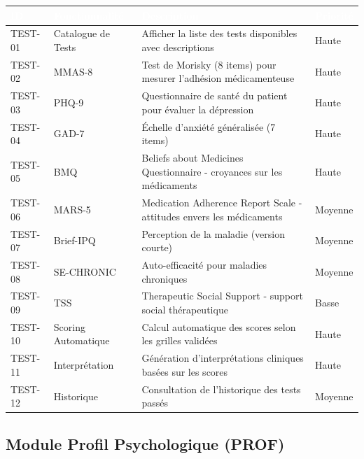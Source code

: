 \documentclass[12pt,a4paper]{report}
\begin{document}
\begin{longtable}{|p{2cm}|p{4cm}|p{7cm}|p{1.5cm}|}
    \hline
    \rowcolor{emsiblue}\textcolor{white}{\textbf{ID}} & \textcolor{white}{\textbf{Fonctionnalité}} & \textcolor{white}{\textbf{Description}} & \textcolor{white}{\textbf{Priorité}} \\
    \hline
    \endfirsthead
    
    TEST-01 & Catalogue de Tests & Afficher la liste des tests disponibles avec descriptions & Haute \\
    \hline
    TEST-02 & MMAS-8 & Test de Morisky (8 items) pour mesurer l'adhésion médicamenteuse & Haute \\
    \hline
    TEST-03 & PHQ-9 & Questionnaire de santé du patient pour évaluer la dépression & Haute \\
    \hline
    TEST-04 & GAD-7 & Échelle d'anxiété généralisée (7 items) & Haute \\
    \hline
    TEST-05 & BMQ & Beliefs about Medicines Questionnaire - croyances sur les médicaments & Haute \\
    \hline
    TEST-06 & MARS-5 & Medication Adherence Report Scale - attitudes envers les médicaments & Moyenne \\
    \hline
    TEST-07 & Brief-IPQ & Perception de la maladie (version courte) & Moyenne \\
    \hline
    TEST-08 & SE-CHRONIC & Auto-efficacité pour maladies chroniques & Moyenne \\
    \hline
    TEST-09 & TSS & Therapeutic Social Support - support social thérapeutique & Basse \\
    \hline
    TEST-10 & Scoring Automatique & Calcul automatique des scores selon les grilles validées & Haute \\
    \hline
    TEST-11 & Interprétation & Génération d'interprétations cliniques basées sur les scores & Haute \\
    \hline
    TEST-12 & Historique & Consultation de l'historique des tests passés & Moyenne \\
    \hline
\end{longtable}

\subsection{Module Profil Psychologique (PROF)}
\end{document}
